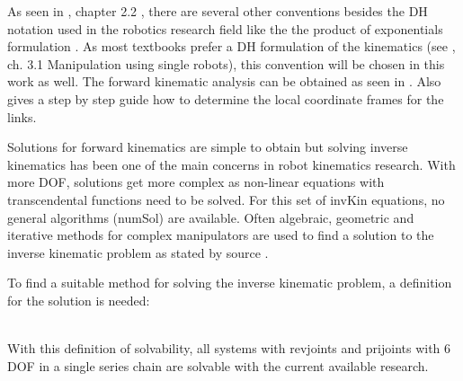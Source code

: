 As seen in 
\cite{MathIntroRobManip}, chapter 2.2
, there are several other conventions besides the \acrfull{DH} notation used in the robotics research field like the the product of exponentials formulation %
.
As most textbooks prefer a \ac{DH} formulation of the kinematics (see \cite{MathIntroRobManip}, ch. 3.1 Manipulation using single robots), this convention will be chosen in this work as well.
The forward kinematic analysis can be obtained as seen in %
\cite{ConstantinForwardKA}. Also \cite{DenavitHartenbergKonventionen} gives a step by step guide how to determine the local coordinate frames for the links.

Solutions for forward  kinematics are simple to obtain but solving inverse kinematics  has  been  one of  the  main  concerns  in  robot kinematics research. 
With more \ac{DOF}, solutions get more complex as non-linear equations with transcendental functions need to be solved. 
For this set of \gls{invKin} equations, no general algorithms (\gls{numSol}) are available.
Often algebraic, geometric and iterative methods for complex manipulators are used to find a solution to the inverse kinematic problem as stated by source %
\cite{FwdInvAnalysRobManip}.

To find a suitable method for solving the inverse kinematic problem, a definition for the solution is needed:\\
\medskip
\\
\bigskip

With this definition of solvability, all systems with \glspl{revjoint} and \glspl{prijoint} with 6 \ac{DOF}  in a single series chain are solvable with the current available research. \cite{invKinSeriallinkMani}
\\

